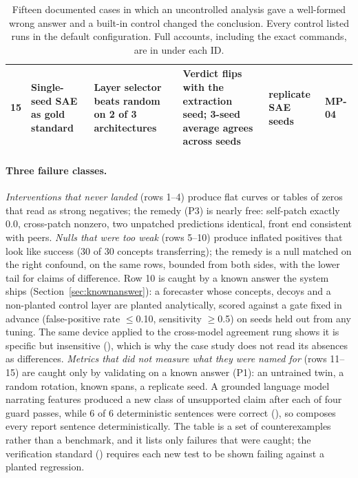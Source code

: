 \begin{table}[p]
\begin{tabularx}{\textwidth}{@{}p{0.3cm}>{\raggedright}p{2.35cm}>{\raggedright}X>{\raggedright}X>{\raggedright}p{2.6cm}l@{}}
15 & Single-seed SAE as gold standard & Layer selector beats random on 2 of 3 architectures & Verdict flips with the extraction seed; 3-seed average agrees across seeds & replicate SAE seeds & MP-04 \\
\bottomrule
\end{tabularx}
\caption{Fifteen documented cases in which an uncontrolled analysis gave a well-formed wrong answer and a
built-in control changed the conclusion. Every control listed runs in the default configuration. Full accounts, including the exact commands, are in 
under each ID.}
\label{tab:controls}
\end{table}

\paragraph{Three failure classes.} \emph{Interventions that never landed} (rows 1--4) produce flat curves or
tables of zeros that read as strong negatives; the remedy (P3) is nearly free: self-patch exactly 0.0,
cross-patch nonzero, two unpatched predictions identical, front end consistent with peers. \emph{Nulls that were
too weak} (rows 5--10) produce inflated positives that look like success (30 of 30 concepts transferring); the
remedy is a null matched on the right confound, on the same rows, bounded from both sides, with the lower tail
for claims of difference. Row 10 is caught by a known answer the system ships (Section~\ref{sec:knownanswer}): a forecaster whose concepts, decoys and a non-planted control layer are planted analytically, scored against a gate fixed in advance (false-positive rate $\le$0.10, sensitivity $\ge$0.5) on seeds held out from any tuning. The same device applied to the cross-model agreement rung shows it is specific but insensitive (), which is why the case study does not read its absences as differences. \emph{Metrics that did not measure what they were named for} (rows 11--15) are caught
only by validating on a known answer (P1): an untrained twin, a random rotation, known spans, a replicate seed.
A grounded language model narrating features produced a new class of unsupported claim after each of four guard
passes, while 6 of 6 deterministic sentences were correct (), so \tool{} composes every report sentence
deterministically. The table is a set of counterexamples rather than a
benchmark, and it lists only failures that were caught; the verification standard ()
requires each new test to be shown failing against a planted regression.
